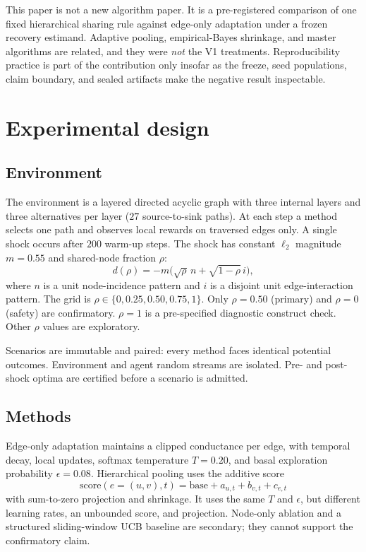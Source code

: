 \documentclass{article}
\begin{document}
This paper is not a new algorithm paper.
It is a pre-registered comparison of one fixed hierarchical sharing rule against edge-only adaptation under a frozen recovery estimand.
Adaptive pooling, empirical-Bayes shrinkage, and master algorithms are related, and they were \emph{not} the V1 treatments.
Reproducibility practice \citep{pineau2021improving} is part of the contribution only insofar as the freeze, seed populations, claim boundary, and sealed artifacts make the negative result inspectable.

\section{Experimental design}

\subsection{Environment}
The environment is a layered directed acyclic graph with three internal layers and three alternatives per layer ($27$ source-to-sink paths).
At each step a method selects one path and observes local rewards on traversed edges only.
A single shock occurs after $200$ warm-up steps.
The shock has constant $\ell_2$ magnitude $m=0.55$ and shared-node fraction $\rho$:
\[
d(\rho)=-m\bigl(\sqrt{\rho}\,n+\sqrt{1-\rho}\,i\bigr),
\]
where $n$ is a unit node-incidence pattern and $i$ is a disjoint unit edge-interaction pattern.
The grid is $\rho\in\{0,0.25,0.50,0.75,1\}$.
Only $\rho=0.50$ (primary) and $\rho=0$ (safety) are confirmatory.
$\rho=1$ is a pre-specified diagnostic construct check.
Other $\rho$ values are exploratory.

Scenarios are immutable and paired: every method faces identical potential outcomes.
Environment and agent random streams are isolated.
Pre- and post-shock optima are certified before a scenario is admitted.

\subsection{Methods}
Edge-only adaptation maintains a clipped conductance per edge, with temporal decay, local updates, softmax temperature $T=0.20$, and basal exploration probability $\epsilon=0.08$.
Hierarchical pooling uses the additive score
\[
\mathrm{score}(e=(u,v),t)=\mathrm{base}+a_{u,t}+b_{v,t}+c_{e,t}
\]
with sum-to-zero projection and shrinkage.
It uses the same $T$ and $\epsilon$, but different learning rates, an unbounded score, and projection.
Node-only ablation and a structured sliding-window UCB baseline are secondary; they cannot support the confirmatory claim.
\end{document}
